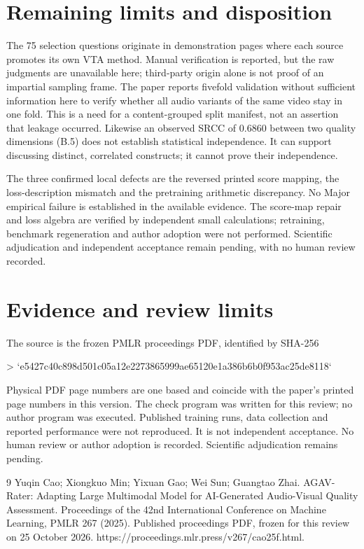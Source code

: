 \documentclass[10pt]{article}
\begin{document}
\section*{Remaining limits and disposition}
The 75 selection questions originate in demonstration pages where each source promotes its own VTA method. Manual verification is reported, but the raw judgments are unavailable here; third-party origin alone is not proof of an impartial sampling frame. The paper reports fivefold validation without sufficient information here to verify whether all audio variants of the same video stay in one fold. This is a need for a content-grouped split manifest, not an assertion that leakage occurred. Likewise an observed SRCC of 0.6860 between two quality dimensions (B.5) does not establish statistical independence. It can support discussing distinct, correlated constructs; it cannot prove their independence.\par
The three confirmed local defects are the reversed printed score mapping, the loss-description mismatch and the pretraining arithmetic discrepancy. No Major empirical failure is established in the available evidence. The score-map repair and loss algebra are verified by independent small calculations; retraining, benchmark regeneration and author adoption were not performed. Scientific adjudication and independent acceptance remain pending, with no human review recorded.\par
\section*{Evidence and review limits}
The source is the frozen PMLR proceedings PDF, identified by SHA-256\par
> `e5427c40c898d501c05a12e2273865999ae65120e1a386b6b0f953ac25de8118`\par
Physical PDF page numbers are one based and coincide with the paper’s printed page numbers in this version. The check program was written for this review; no author program was executed. Published training runs, data collection and reported performance were not reproduced. It is not independent acceptance. No human review or author adoption is recorded. Scientific adjudication remains pending.\par
9 Yuqin Cao; Xiongkuo Min; Yixuan Gao; Wei Sun; Guangtao Zhai. AGAV-Rater: Adapting Large Multimodal Model for AI-Generated Audio-Visual Quality Assessment. Proceedings of the 42nd International Conference on Machine Learning, PMLR 267 (2025). Published proceedings PDF, frozen for this review on 25 October 2026. https://proceedings.mlr.press/v267/cao25f.html.\par
\end{document}

